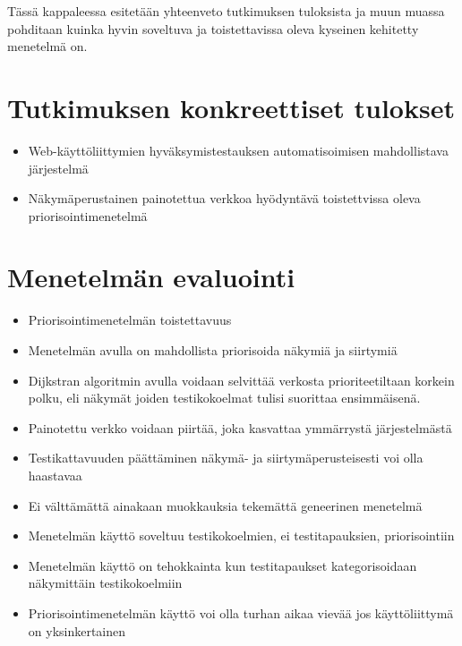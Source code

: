 Tässä kappaleessa esitetään yhteenveto tutkimuksen tuloksista ja muun muassa pohditaan kuinka hyvin soveltuva ja toistettavissa oleva kyseinen kehitetty menetelmä on.

\section{Tutkimuksen konkreettiset tulokset} \label{ch:12_tutkimuksen_konkreettiset_tulokset}

  \begin{itemize}
    \item Web-käyttöliittymien hyväksymistestauksen automatisoimisen mahdollistava järjestelmä
    \item Näkymäperustainen painotettua verkkoa hyödyntävä toistettvissa oleva priorisointimenetelmä
  \end{itemize}

\section{Menetelmän evaluointi} \label{ch:12_menetelman_evaluointi}

  \begin{itemize}
    \item Priorisointimenetelmän toistettavuus
    \item Menetelmän avulla on mahdollista priorisoida näkymiä ja siirtymiä
    \item Dijkstran algoritmin avulla voidaan selvittää verkosta prioriteetiltaan korkein polku, eli näkymät joiden testikokoelmat tulisi suorittaa ensimmäisenä.
    \item Painotettu verkko voidaan piirtää, joka kasvattaa ymmärrystä järjestelmästä
    \item Testikattavuuden päättäminen näkymä- ja siirtymäperusteisesti voi olla haastavaa
    \item Ei välttämättä ainakaan muokkauksia tekemättä geneerinen menetelmä
    \item Menetelmän käyttö soveltuu testikokoelmien, ei testitapauksien, priorisointiin
    \item Menetelmän käyttö on tehokkainta kun testitapaukset kategorisoidaan näkymittäin testikokoelmiin
    \item Priorisointimenetelmän käyttö voi olla turhan aikaa vievää jos käyttöliittymä on yksinkertainen
  \end{itemize}


